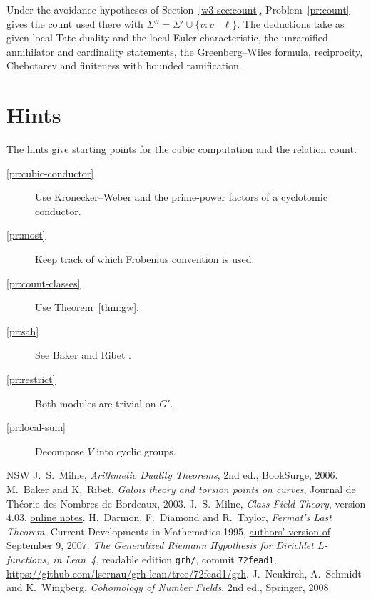 \documentclass[reqno]{amsart}
\theoremstyle{definition}
\theoremstyle{plain}
\begin{document}
Under the avoidance hypotheses of Section~\ref{w3-sec:count},
Problem~\ref{pr:count} gives the count used there with
\(\Sigma''=\Sigma'\cup\{v:v\mid\ell\}\).  The deductions take as given
local Tate duality and the local Euler characteristic, the
unramified annihilator and cardinality statements, the Greenberg--Wiles
formula, reciprocity, Chebotarev and finiteness with bounded ramification.

\newpage
\section*{Hints}
The hints give starting points for the cubic computation and the relation count.

\begin{description}
\item[\ref{pr:cubic-conductor}] Use Kronecker--Weber and the
prime-power factors of a cyclotomic conductor.
\item[\ref{pr:most}] Keep track of which Frobenius convention is used.
\item[\ref{pr:count-classes}] Use Theorem~\ref{thm:gw}.
\item[\ref{pr:sah}] See Baker and Ribet \cite[Lemma~A.2]{BR}.
\item[\ref{pr:restrict}] Both modules are trivial on \(G'\).
\item[\ref{pr:local-sum}] Decompose \(V\) into cyclic groups.
\end{description}

{\small
\begin{thebibliography}{NSW}
 J.~S.~Milne, \emph{Arithmetic Duality Theorems},
2nd ed., BookSurge, 2006.
 M.~Baker and K.~Ribet,
\emph{Galois theory and torsion points on curves},
Journal de Th\'eorie des Nombres de Bordeaux, 2003.
 J.~S.~Milne, \emph{Class Field Theory}, version 4.03,
\href{https://www.jmilne.org/math/CourseNotes/cft.html}{online notes}.
 H.~Darmon, F.~Diamond and R.~Taylor,
\emph{Fermat's Last Theorem}, Current Developments in Mathematics 1995,
\href{https://www.math.mcgill.ca/darmon/pub/Articles/Expository/05.DDT/paper.pdf}{authors' version of September 9, 2007}.
 \emph{The Generalized Riemann Hypothesis for
Dirichlet \(L\)-functions, in Lean~4}, readable edition \texttt{grh/},
commit \texttt{72fead1},
\url{https://github.com/lsernau/grh-lean/tree/72fead1/grh}.
 J.~Neukirch, A.~Schmidt and K.~Wingberg,
\emph{Cohomology of Number Fields}, 2nd ed., Springer, 2008.
\end{thebibliography}
}
\end{document}

